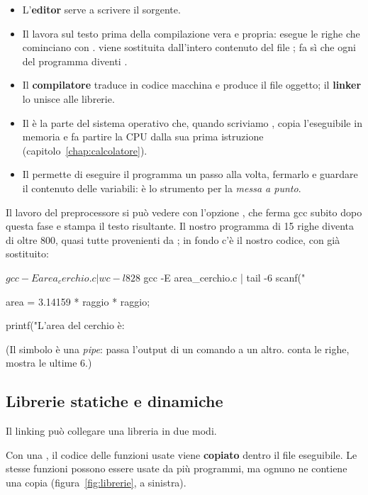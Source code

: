 \begin{itemize}
  \item L'\textbf{editor} serve a scrivere il sorgente.
  \item Il  lavora sul testo prima della compilazione
        vera e propria: esegue le righe che cominciano con \code{\#}.
         viene sostituita dall'intero contenuto
        del file ;  fa sì che ogni
         del programma diventi .
  \item Il \textbf{compilatore} traduce in codice macchina e produce il
        file oggetto; il \textbf{linker} lo unisce alle librerie.
  \item Il  è la parte del sistema operativo che, quando
        scriviamo , copia l'eseguibile in memoria e fa partire
        la CPU dalla sua prima istruzione (capitolo~\ref{chap:calcolatore}).
  \item Il  permette di eseguire il programma un passo alla
        volta, fermarlo e guardare il contenuto delle variabili: è lo
        strumento per la \textit{messa a punto}.
\end{itemize}

Il lavoro del preprocessore si può vedere con l'opzione , che
ferma gcc subito dopo questa fase e stampa il testo risultante. Il nostro
programma di 15 righe diventa di oltre 800, quasi tutte provenienti da
; in fondo c'è il nostro codice, con  già sostituito:

\begin{console}
$ gcc -E area_cerchio.c | wc -l
828
$ gcc -E area_cerchio.c | tail -6
    scanf("%

    area = 3.14159 * raggio * raggio;

    printf("L'area del cerchio è: %
\end{console}

(Il simbolo \code{|} è una \textit{pipe}: passa l'output di un comando a un
altro.  conta le righe,  mostra le ultime 6.)

\subsection{Librerie statiche e dinamiche}

Il linking può collegare una libreria in due modi.

Con una , il codice delle funzioni usate viene
\textbf{copiato} dentro il file eseguibile. Le stesse funzioni possono
essere usate da più programmi, ma ognuno ne contiene una copia
(figura~\ref{fig:librerie}, a sinistra).

